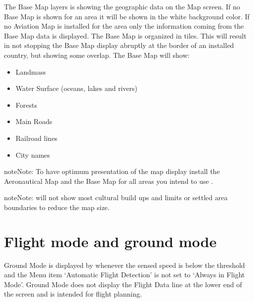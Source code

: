 \documentclass[letterpaper,10pt,english]{sphinxmanual}
\begin{document}
\sphinxAtStartPar
{}

\sphinxAtStartPar
The Base Map layers is showing the geographic data on the Map screen. If no Base
Map is shown for an area it will be shown in the white background color. If no
Aviation Map is installed for the area only the information coming from the Base
Map data is displayed. The Base Map is organized in tiles. This will result in
not stopping the Base Map display abruptly at the border of an installed
country, but showing some overlap.  The Base Map will show:
\begin{itemize}
\item {} 
\sphinxAtStartPar
Landmass

\item {} 
\sphinxAtStartPar
Water Surface (oceans, lakes and rivers)

\item {} 
\sphinxAtStartPar
Forests

\item {} 
\sphinxAtStartPar
Main Roads

\item {} 
\sphinxAtStartPar
Railroad lines

\item {} 
\sphinxAtStartPar
City names

\end{itemize}

\begin{sphinxadmonition}{note}{Note:}
\sphinxAtStartPar
To have optimum presentation of the  map
display install the Aeronautical Map and the Base Map for all areas you
intend to use .
\end{sphinxadmonition}

\begin{sphinxadmonition}{note}{Note:}
\sphinxAtStartPar
{} will not show most cultural build ups
and limits or settled area boundaries to reduce the map size.
\end{sphinxadmonition}


\section{Flight mode and ground mode}
\label{\detokenize{03-reference/map_data:flight-mode-and-ground-mode}}
\sphinxAtStartPar
{}

\sphinxAtStartPar
Ground Mode is displayed by  whenever the sensed
speed is below the threshold and the Menu item ‘Automatic Flight Detection’ is
not set to ‘Always in Flight Mode’.  Ground Mode does not display the Flight
Data line at the lower end of the screen and is intended for flight planning.
\end{document}
